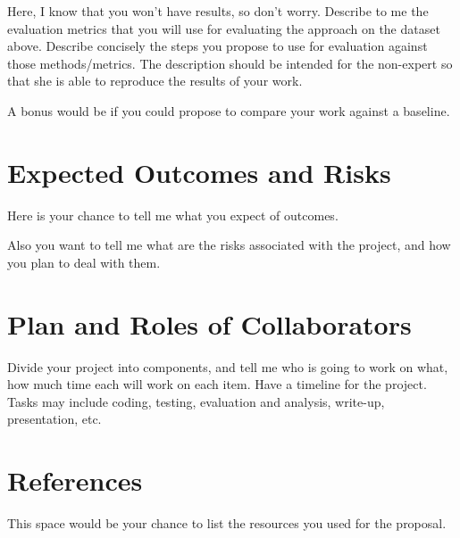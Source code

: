 \documentclass[conference]{sig-alternate-05-2015}
\begin{document}
Here, I know that you won't have results, so don't worry. Describe to me the evaluation metrics that you will use for evaluating the approach on the dataset above. Describe concisely the steps you propose to use for evaluation against those methods/metrics. The description should be intended for the non-expert so that she is able to reproduce the results of your work. 

A bonus would be if you could propose to compare your work against a baseline. 

\section{Expected Outcomes and Risks}

Here is your chance to tell me what you expect of outcomes. 

Also you want to tell me what are the risks associated with the project, and how you plan to deal with them. 

\section{Plan and Roles of Collaborators}
Divide your project into components, and tell me who is going to work on what, how much time each will work on each item. Have a timeline for the project. Tasks may include coding, testing, evaluation and analysis, write-up, presentation, etc. 


\section{References}\label{sec:conclusion}
This space would be your chance to list the resources you used for the proposal. 



\end{document}
